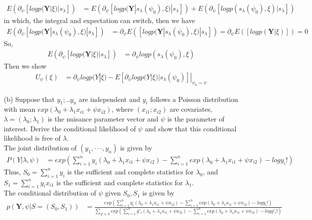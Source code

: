 \documentclass[11pt]{article} %
\begin{document}
\begin{itemize}
\begin{align*}
		E \left( \partial_{\psi}[log p(\textbf{Y}| \xi)| s_{\lambda}]\right) &= E \left(\partial_{\psi}[log  p(\textbf{Y}|s_{\lambda}(\psi_0), \xi)|s_{\lambda}]\right) + E \left(\partial_{\psi}[log p(s_{\lambda}(\psi_0), \xi)|s_{\lambda}]\right)
	\end{align*}    
	in which, the integral and expectation can switch, then we have
	\begin{align*}
		E \left(\partial_{\psi}[log  p(\textbf{Y}|s_{\lambda}(\psi_0), \xi)|s_{\lambda}]\right) & = \partial_{\psi} E \left([log  p(\textbf{Y}|s_{\lambda}(\psi_0), \xi)|s_{\lambda}]\right) = \partial_{\psi} E \left([log  p(\textbf{Y}| \xi)]\right)= 0
	\end{align*}      
	So,
	\begin{align*}
		E \left( \partial_{\psi}[log p(\textbf{Y}| \xi)| s_{\lambda}]\right) &= \partial_{\psi}log p(s_{\lambda}(\psi_0),\xi)
	\end{align*}
	Then we show
	\begin{align*}
		U_{\psi}(\xi) &= \partial_{\psi} log p(Y|\xi)- E[\partial_{\psi} log p(Y|\xi)|s_{\lambda}(\psi_0)]|_{\psi_0=\psi}
	\end{align*} 
	\item[(b)] Suppose that $y_1;.. y_n$ are independent and $y_i$ follows a Poisson distribution with mean $exp(\lambda_0 + \lambda_1x_{i1} +  \psi x_{i2})$, where $(x_{i1}; x_{i2})$ are covariates, $\lambda = (\lambda_0; \lambda_1)$ is the
	nuisance parameter vector and $\psi$  is the parameter of interest. Derive the conditional
	likelihood of $\psi$   and show that this conditional likelihood is free of $\lambda$.\\
	The joint distribution of $(y_1, · · · , y_n)$ is given by 
	\begin{align*}
		P(Y|\lambda, \psi)&=  exp \left( \sum_{i=1}^n y_i(\lambda_0 + \lambda_1x_{i1} +  \psi x_{i2}) - \sum_{i=1}^n exp(\lambda_0 + \lambda_1x_{i1} +  \psi x_{i2}) - log y_i! \right)
	\end{align*}
	Thus, $S_0 = \sum_{i=1}^n y_i$ is the sufficient and complete statistics for $\lambda_0$, and $S_1 = \sum_{i=1}^n y_i x_{i1}$ is the sufficient and complete statistics for $\lambda_1$.\\
	The conditional distribution of $\psi$ given $S_0, S_1$ is given by
	\begin{align*}
		p(\textbf{Y}, \psi|S=(S_0, S_1)) &= \frac{exp \left( \sum_{i=1}^n y_i(\lambda_0 + \lambda_1x_{i1} +  \psi x_{i2}) - \sum_{i=1}^n exp(\lambda_0 + \lambda_1x_{i1} +  \psi x_{i2}) - log y_i! \right)}{\sum_{y' \in S} exp \left( \sum_{i=1}^n y'_i(\lambda_0 + \lambda_1 x_{i1} +  \psi x_{i2}) - \sum_{i=1}^n exp(\lambda_0 + \lambda_1 x_{i1} +  \psi x_{i2}) - log y'_i! \right)}\\

\end{align*}
\end{itemize}
\end{document}
